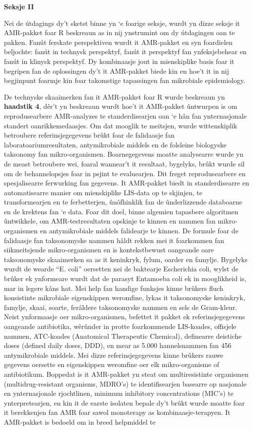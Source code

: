 \documentclass[
]{book}
\begin{document}
\textbf{Seksje II}

Nei de útdagings dy't sketst binne yn `e foarige seksje, wurdt yn dizze seksje it AMR-pakket foar R beskreaun as in nij ynstrumint om dy útdagingen oan te pakken. Fanút ferskate perspektiven wurdt it AMR-pakket en syn foardielen beljochte: fanút in technysk perspektyf, fanút it perspektyf fan ynfeksjebehear en fanút in klinysk perspektyf. Dy kombinaasje jout in mienskiplike basis foar it begripen fan de oplossingen dy't it AMR-pakket biede kin en hoe't it in nij begjinpunt foarmje kin foar takomstige tapassingen fan mikrobiale epidemiology.

De technyske skaaimerken fan it AMR-pakket foar R wurde beskreaun yn \textbf{haadstik 4}, dêr't yn beskreaun wurdt hoe't it AMR-pakket ûntwurpen is om reprodusearbere AMR-analyzes te standerdisearjen oan `e hân fan ynternasjonale standert oanrikkemedaasjes. Om dat mooglik te meitsjen, wurde wittenskiplik betroubere referinsjegegevens brûkt foar de falidaasje fan laboratoariumresultaten, antymikrobiale middels en de folsleine biologyske taksonomy fan mikro-organismen. Boarnegegevens moatte analysearre wurde yn de meast betroubere wei, foaral wannear't it resultaat, bygelyks, brûkt wurde sil om de behannelopsjes foar in psjint te evaluearjen. Dit freget reprodusearbere en spesjalisearre ferwurking fan gegevens. It AMR-pakket biedt in standerdisearre en automatisearre manier om mienskiplike LIS-data op te skjinjen, te transformearjen en te ferbetterjen, ûnôfhinklik fan de ûnderlizzende databoarne en de krektens fan `e data. Foar dit doel, binne algemien tapasbere algoritmen ûntwikkele, om AMR-testresultaten opskinje te kinnen en nammen fan mikro-organismen en antymikrobiale middels falidearje te kinnen. De formule foar de falidaasje fan taksonomyske nammen hâldt rekken mei it foarkommen fan siikmeitsjende mikro-organismen en is kontekstbewust oangeande oare taksonomyske skaaimerken sa as it keninkryk, fylum, oarder en famylje. Bygelyks wurdt de wearde ``E. coli'' oersetten nei de baktearje Escherichia coli, wylst de brûker ek ynformeare wurdt dat de parasyt Entamoeba coli ek in mooglikheid is, mar in legere kâns hat. Mei help fan handige funksjes kinne brûkers fluch konsistinte mikrobiale eigenskippen weromfine, lykas it taksonomyske keninkryk, famylje, skaai, soarte, ferâldere taksonomyske nammen en sels de Gram-kleur. Neist ynformaasje oer mikro-organismen, befettet it pakket ek referinsjegegevens oangeande antibiotika, wêrûnder in protte foarkommende LIS-koades, offisjele nammen, ATC-koades (Anatomical Therapeutic Chemical), definearre deistiche doses (defined daily doses, DDD), en mear as 5.000 hannelsnammen fan 456 antymikrobiale middels. Mei dizze referinsjegegevens kinne brûkers rauwe gegevens oersette en eigenskippen weromfine oer elk mikro-organisme of antibiotikum. Boppedat is it AMR-pakket yn steat om multiresistinte organismen (multidrug-resistant organisms, MDRO's) te identifisearjen basearre op nasjonale en ynternasjonale rjochtlinen, minimum inhibitory concentrations (MIC's) te ynterpretearjen, en kin it de earste isolaten bepale dy't brûkt wurde moatte foar it berekkenjen fan AMR foar sawol monoterapy as kombinaasje-terapyen. It AMR-pakket is bedoeld om in breed helpmiddel te 
\end{document}
